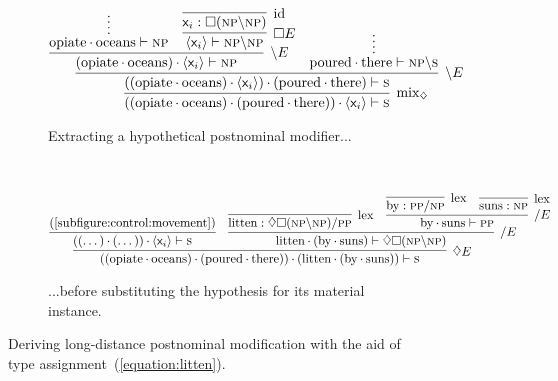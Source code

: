 \begin{figure}
	\centering
	\begin{subfigure}{1\textwidth}
		\smaller
		\[
			\infer[\rulestyle{mix}_{\diamond}]{((\w{opiate}\sbind\w{oceans})\sbind(\w{poured}\sbind\w{there}))\sbind\bracket{\term{\vari }} \vdash \s}{
				\infer[\divleft E]{((\w{opiate}\sbind\w{oceans})\sbind\bracket{\term{\vari }})\sbind(\w{poured}\sbind\w{there}) \vdash \s}{
					\infer[\divleft E]{(\w{opiate}\sbind\w{oceans})\sbind\bracket{\term{\vari }} \vdash \np}{
						\infer*{\w{opiate}\sbind\w{oceans} \vdash \np}{}
						&
						\infer[\Box E]{\bracket{\term{\vari }} \vdash \np\divleft\np}{
							\infer[\Ax]{\term{\vari }: \Box (\np\divleft\np)}{}
						}
					}
					&
					\infer*{\w{poured}\sbind\w{there} \vdash \np\divleft\s}{}
				}
			}
		\]
		\caption{Extracting a hypothetical postnominal modifier...}
		\label{subfigure:control:movement}
	\end{subfigure}\\[\midsep]
	\begin{subfigure}{1\textwidth}
	\centering
		\smaller
		\[
			\infer[\diamond E]{((\w{opiate}\sbind\w{oceans})\sbind(\w{poured}\sbind\w{there}))\sbind(\w{litten}\sbind(\w{by}\sbind\w{suns})) \vdash \s}{
				\infer{((\dots)\sbind(\dots))\sbind\bracket{\term{\vari }} \vdash \s}{\text{(\ref{subfigure:control:movement})}}
				&
				\infer[\divright E]{\w{litten}\sbind(\w{by}\sbind\w{suns}) \vdash \diamond\Box(\np\divleft\np)}{
					\infer[\Lex]{\w{litten} : \diamond\Box(\np\divleft\np)\divright\pp }{}
					&
					\infer[\divright E]{\w{by}\sbind\w{suns} \vdash \pp}{
						\infer[\Lex]{\w{by}: \pp\divright\np}{}
						&
						\infer[\Lex]{\w{suns}: \np}{}
					}
				}
			}
		\]
		\caption{...before substituting the hypothesis for its material instance.}
		\label{subfigure:control:substitution}
	\end{subfigure}
	\caption{Deriving long-distance postnominal modification with the aid of type assignment~(\ref{equation:litten}).}
	\label{figure:lovecraft_postnominal}
\end{figure}


